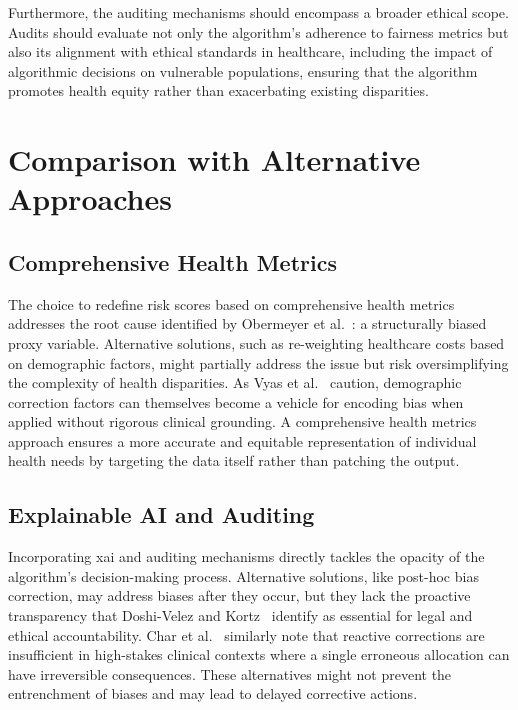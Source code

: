 \documentclass[11pt,showkeys]{essay}
\begin{document}
Furthermore, the auditing mechanisms should encompass a broader ethical scope. Audits should evaluate not only the algorithm's adherence to fairness metrics but also its alignment with ethical standards in healthcare, including the impact of algorithmic decisions on vulnerable populations, ensuring that the algorithm promotes health equity rather than exacerbating existing disparities.

\section{Comparison with Alternative Approaches}

\subsection{Comprehensive Health Metrics}

The choice to redefine risk scores based on comprehensive health metrics addresses the root cause identified by Obermeyer et al.~\cite{obermeyer_dissecting_2019}: a structurally biased proxy variable. Alternative solutions, such as re-weighting healthcare costs based on demographic factors, might partially address the issue but risk oversimplifying the complexity of health disparities. As Vyas et al.~\cite{vyas_hidden_2020} caution, demographic correction factors can themselves become a vehicle for encoding bias when applied without rigorous clinical grounding. A comprehensive health metrics approach ensures a more accurate and equitable representation of individual health needs by targeting the data itself rather than patching the output.

\subsection{Explainable AI and Auditing}

Incorporating \gls{xai} and auditing mechanisms directly tackles the opacity of the algorithm's decision-making process. Alternative solutions, like post-hoc bias correction, may address biases after they occur, but they lack the proactive transparency that Doshi-Velez and Kortz~\cite{doshivelez_accountability_2017} identify as essential for legal and ethical accountability. Char et al.~\cite{char_implementing_2018} similarly note that reactive corrections are insufficient in high-stakes clinical contexts where a single erroneous allocation can have irreversible consequences. These alternatives might not prevent the entrenchment of biases and may lead to delayed corrective actions.
\end{document}
